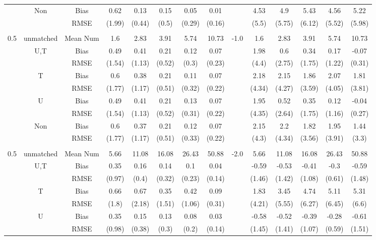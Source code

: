 \begin{tabular}{@{\extracolsep{5pt}}lc|cccccc|lccccc}
 & Non & Bias & 0.62 & 0.13 & 0.15 & 0.05 & 0.01 &  & 4.53 & 4.9 & 5.43 & 4.56 & 5.22 \\
 &  & RMSE & (1.99) & (0.44) & (0.5) & (0.29) & (0.16) &  & (5.5) & (5.75) & (6.12) & (5.52) & (5.98) \\
 &  &  &  &  &  &  &  &  &  &  &  &  &  \\
0.5 & unmatched & Mean Num & 1.6 & 2.83 & 3.91 & 5.74 & 10.73 & -1.0 & 1.6 & 2.83 & 3.91 & 5.74 & 10.73 \\
 & U,T & Bias & 0.49 & 0.41 & 0.21 & 0.12 & 0.07 &  & 1.98 & 0.6 & 0.34 & 0.17 & -0.07 \\
 &  & RMSE & (1.54) & (1.13) & (0.52) & (0.3) & (0.23) &  & (4.4) & (2.75) & (1.75) & (1.22) & (0.31) \\
 & T & Bias & 0.6 & 0.38 & 0.21 & 0.11 & 0.07 &  & 2.18 & 2.15 & 1.86 & 2.07 & 1.81 \\
 &  & RMSE & (1.77) & (1.17) & (0.51) & (0.32) & (0.22) &  & (4.34) & (4.27) & (3.59) & (4.05) & (3.81) \\
 & U & Bias & 0.49 & 0.41 & 0.21 & 0.13 & 0.07 &  & 1.95 & 0.52 & 0.35 & 0.12 & -0.04 \\
 &  & RMSE & (1.54) & (1.13) & (0.52) & (0.31) & (0.22) &  & (4.35) & (2.64) & (1.75) & (1.16) & (0.27) \\
 & Non & Bias & 0.6 & 0.37 & 0.21 & 0.12 & 0.07 &  & 2.15 & 2.2 & 1.82 & 1.95 & 1.44 \\
 &  & RMSE & (1.77) & (1.17) & (0.51) & (0.33) & (0.22) &  & (4.3) & (4.34) & (3.56) & (3.91) & (3.3) \\
 &  &  &  &  &  &  &  &  &  &  &  &  &  \\
0.5 & unmatched & Mean Num & 5.66 & 11.08 & 16.08 & 26.43 & 50.88 & -2.0 & 5.66 & 11.08 & 16.08 & 26.43 & 50.88 \\
 & U,T & Bias & 0.35 & 0.16 & 0.14 & 0.1 & 0.04 &  & -0.59 & -0.53 & -0.41 & -0.3 & -0.59 \\
 &  & RMSE & (0.97) & (0.4) & (0.32) & (0.23) & (0.14) &  & (1.46) & (1.42) & (1.08) & (0.61) & (1.48) \\
 & T & Bias & 0.66 & 0.67 & 0.35 & 0.42 & 0.09 &  & 1.83 & 3.45 & 4.74 & 5.11 & 5.31 \\
 &  & RMSE & (1.8) & (2.18) & (1.51) & (1.06) & (0.31) &  & (4.21) & (5.55) & (6.27) & (6.45) & (6.6) \\
 & U & Bias & 0.35 & 0.15 & 0.13 & 0.08 & 0.03 &  & -0.58 & -0.52 & -0.39 & -0.28 & -0.61 \\
 &  & RMSE & (0.98) & (0.38) & (0.3) & (0.2) & (0.14) &  & (1.45) & (1.41) & (1.07) & (0.59) & (1.51) \\

\end{tabular}
